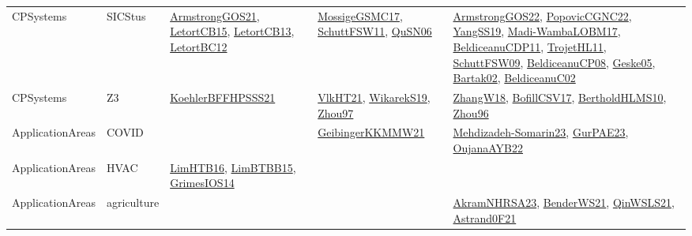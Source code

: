 {\begin{longtable}{lp{3cm}>{\raggedright}p{6cm}>{\raggedright}p{6cm}p{8cm}}
CPSystems & SICStus & \href{papers/ArmstrongGOS21.pdf}{ArmstrongGOS21}\cite{ArmstrongGOS21}, \href{articles/LetortCB15.pdf}{LetortCB15}\cite{LetortCB15}, \href{papers/LetortCB13.pdf}{LetortCB13}\cite{LetortCB13}, \href{papers/LetortBC12.pdf}{LetortBC12}\cite{LetortBC12} & \href{papers/MossigeGSMC17.pdf}{MossigeGSMC17}\cite{MossigeGSMC17}, \href{articles/SchuttFSW11.pdf}{SchuttFSW11}\cite{SchuttFSW11}, \href{papers/QuSN06.pdf}{QuSN06}\cite{QuSN06} & \href{papers/ArmstrongGOS22.pdf}{ArmstrongGOS22}\cite{ArmstrongGOS22}, \href{papers/PopovicCGNC22.pdf}{PopovicCGNC22}\cite{PopovicCGNC22}, \href{papers/YangSS19.pdf}{YangSS19}\cite{YangSS19}, \href{papers/Madi-WambaLOBM17.pdf}{Madi-WambaLOBM17}\cite{Madi-WambaLOBM17}, \href{articles/BeldiceanuCDP11.pdf}{BeldiceanuCDP11}\cite{BeldiceanuCDP11}, \href{articles/TrojetHL11.pdf}{TrojetHL11}\cite{TrojetHL11}, \href{papers/SchuttFSW09.pdf}{SchuttFSW09}\cite{SchuttFSW09}, \href{papers/BeldiceanuCP08.pdf}{BeldiceanuCP08}\cite{BeldiceanuCP08}, \href{papers/Geske05.pdf}{Geske05}\cite{Geske05}, \href{papers/Bartak02.pdf}{Bartak02}\cite{Bartak02}, \href{papers/BeldiceanuC02.pdf}{BeldiceanuC02}\cite{BeldiceanuC02}\\
CPSystems & Z3 & \href{articles/KoehlerBFFHPSSS21.pdf}{KoehlerBFFHPSSS21}\cite{KoehlerBFFHPSSS21} & \href{articles/VlkHT21.pdf}{VlkHT21}\cite{VlkHT21}, \href{articles/WikarekS19.pdf}{WikarekS19}\cite{WikarekS19}, \href{articles/Zhou97.pdf}{Zhou97}\cite{Zhou97} & \href{articles/ZhangW18.pdf}{ZhangW18}\cite{ZhangW18}, \href{papers/BofillCSV17.pdf}{BofillCSV17}\cite{BofillCSV17}, \href{papers/BertholdHLMS10.pdf}{BertholdHLMS10}\cite{BertholdHLMS10}, \href{papers/Zhou96.pdf}{Zhou96}\cite{Zhou96}\\
ApplicationAreas & COVID &  & \href{papers/GeibingerKKMMW21.pdf}{GeibingerKKMMW21}\cite{GeibingerKKMMW21} & \href{papers/Mehdizadeh-Somarin23.pdf}{Mehdizadeh-Somarin23}\cite{Mehdizadeh-Somarin23}, \href{articles/GurPAE23.pdf}{GurPAE23}\cite{GurPAE23}, \href{papers/OujanaAYB22.pdf}{OujanaAYB22}\cite{OujanaAYB22}\\
ApplicationAreas & HVAC & \href{papers/LimHTB16.pdf}{LimHTB16}\cite{LimHTB16}, \href{papers/LimBTBB15.pdf}{LimBTBB15}\cite{LimBTBB15}, \href{articles/GrimesIOS14.pdf}{GrimesIOS14}\cite{GrimesIOS14} &  & \\
ApplicationAreas & agriculture &  &  & \href{articles/AkramNHRSA23.pdf}{AkramNHRSA23}\cite{AkramNHRSA23}, \href{papers/BenderWS21.pdf}{BenderWS21}\cite{BenderWS21}, \href{articles/QinWSLS21.pdf}{QinWSLS21}\cite{QinWSLS21}, \href{papers/Astrand0F21.pdf}{Astrand0F21}\cite{Astrand0F21}\\

\end{longtable}}
